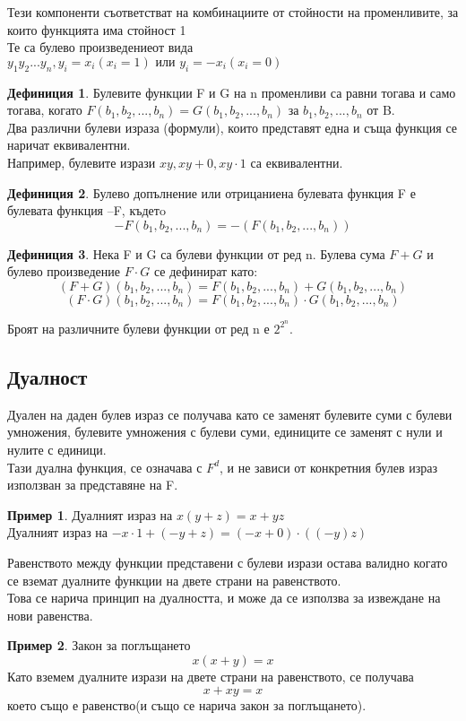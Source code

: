 \documentclass[fleqn, 12pt]{article}
\theoremstyle{definition}
\newtheorem{example}{Пример}[subsection]
\newtheorem{definition}{Дефиниция}[subsection]
\begin{document}
Тези компоненти съответстват на комбинациите от стойности на променливите, за които функцията има стойност 1\\
Те са булево произведениеот вида $y_1y_2...y_n,y_i= x_i (x_i=1) \text{ или }y_i= -x_i(x_i=0)$
\begin{definition}
Булевите функции F и G на n променливи са равни тогава и само тогава, когато $F(b_1, b_2, ..., b_n) = G(b_1, b_2, ..., b_n)$ за $b_1, b_2, ..., b_n$ от B.\\
Два различни булеви израза (формули), които представят една и съща функция се наричат еквивалентни.\\
Например, булевите изрази $xy , xy + 0 ,xy \cdot1$ са еквивалентни.
\end{definition}
\begin{definition}
Булево допълнение или отрицаниена булевата функция F е булевата функция –F, къдетo
$$-F(b_1, b_2, ..., b_n) = -(F(b_1, b_2, ..., b_n))$$
\end{definition}
\begin{definition}
Нека F и G са булеви функции от ред n. Булева сума $F+G$ и булево произведение $F \cdot G$ се дефинират като:
$$(F+G)(b_1, b_2, ..., b_n) = F(b_1, b_2, ..., b_n) + G(b_1, b_2, ..., b_n)$$
$$(F \cdot G)(b_1, b_2, ..., b_n) = F(b_1, b_2, ..., b_n) \cdot G(b_1, b_2, ..., b_n)$$
\end{definition}
Броят на различните булеви функции от ред n е $2^{2^n}$.

\subsection{Дуалност}
Дуален на даден булев израз се получава като се заменят булевите суми с булеви умножения, булевите умножения с булеви суми, единиците се заменят с нули и нулите с единици. \\
Тази дуална функция, се означава с $F^d$, и не зависи от конкретния булев израз използван за представяне на F.
\begin{example}
Дуалният израз на $x(y+z) = x + yz$\\
Дуалният израз на $-x\cdot1 + (-y+z) = (-x + 0) \cdot ((-y)z)$
\end{example}
Равенството между функции представени с булеви изрази остава валидно когато се вземат дуалните функции на двете страни на равенството.\\
Това се нарича принцип на дуалността, и може да се използва за извеждане на нови равенства.
\begin{example}
Закон за поглъщането\\
$$x(x+y) = x$$
Като вземем дуалните изрази на двете страни на равенството, се получава 
$$x + xy = x$$
което също е равенство(и също се нарича закон за поглъщането).
\end{example}
\end{document}
